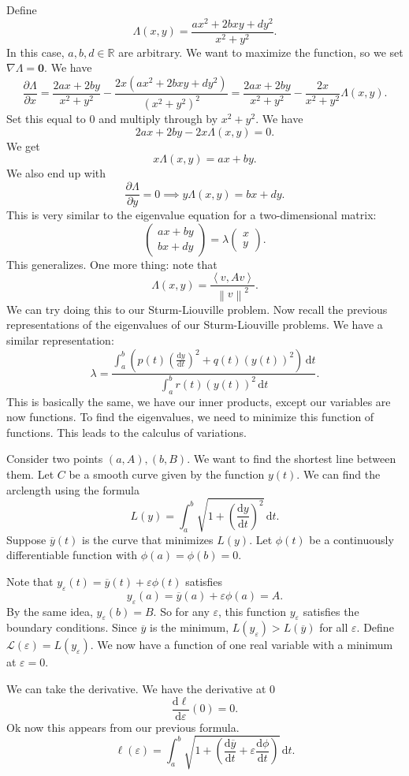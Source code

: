 Define
\[
	\Lambda (x,y)=\frac{ax^2+2bxy+dy^2}{x^2+y^2}
.\]
In this case, $a,b,d\in\mathbb{R}$ are arbitrary. We want to maximize the function, so we set $\nabla \Lambda =\mathbf{0}$. We have
\[
	\frac{\partial \Lambda }{\partial x} =\frac{2ax+2by}{x^2+y^2}-\frac{2x\left( ax^2+2bxy+dy^2 \right) }{\left( x^2+y^2 \right) ^2}=\frac{2ax+2by}{x^2+y^2}-\frac{2x}{x^2+y^2}\Lambda (x,y)
.\]
Set this equal to $0$ and multiply through by $x^2+y^2$. We have
\[
	2ax+2by-2x\Lambda (x,y)=0
.\]
We get
\[
	x\Lambda(x,y)=ax+by
.\]
We also end up with
\[
	\frac{\partial \Lambda }{\partial y} =0 \implies y\Lambda(x,y)=bx+dy
.\]
This is very similar to the eigenvalue equation for a two-dimensional matrix:
\[
	\begin{pmatrix}
		ax+by\\
		bx+dy
	\end{pmatrix} =\lambda \begin{pmatrix}
		x\\
		y
	\end{pmatrix} 
.\]
This generalizes. One more thing: note that
\[
	\Lambda(x,y)=\frac{\left\langle v,Av \right\rangle }{\left\lVert v \right\rVert^2}
.\]
We can try doing this to our Sturm-Liouville problem. Now recall the previous representations of the eigenvalues of our Sturm-Liouville problems. We have a similar representation:
\[
	\lambda =\frac{\int_{a}^{b} \left( p(t)\left( \frac{\mathrm{d}y}{\mathrm{d}t}  \right) ^2+q(t)(y(t))^2 \right)  \,\mathrm{d} t}{\int_{a}^{b} r(t)(y(t))^2 \,\mathrm{d} t}
.\]
This is basically the same, we have our inner products, except our variables are now functions. To find the eigenvalues, we need to minimize this function of functions. This leads to the calculus of variations.

Consider two points $(a,A),(b,B)$. We want to find the shortest line between them. Let $C$ be a smooth curve given by the function $y(t)$. We can find the arclength using the formula
\[
	L(y)=\int_{a}^{b} \sqrt{1+\left( \frac{\mathrm{d}y}{\mathrm{d}t}  \right) ^2}  \,\mathrm{d} t
.\]
Suppose $\overline{y} (t)$ is the curve that minimizes $L(y)$. Let $\phi (t)$ be a continuously differentiable function with $\phi (a)=\phi (b)=0$.

Note that $y_{\varepsilon }(t)=\overline{y} (t)+\varepsilon \phi (t)$ satisfies
\[
	y_{\varepsilon }(a)=\overline{y} (a)+\varepsilon \phi (a)=A
.\]
By the same idea, $y_{\varepsilon }(b)=B$. So for any $\varepsilon $, this function $y_{\varepsilon }$ satisfies the boundary conditions. Since $\overline{y} $ is the minimum, $L(y_{\varepsilon })>L(\overline{y} )$ for all $\varepsilon$. Define $\mathcal{L} (\varepsilon )=L(y_{\varepsilon })$. We now have a function of one real variable with a minimum at $\varepsilon =0$.

We can take the derivative. We have the derivative at $0$
\[
	\frac{\mathrm{d}\ell }{\mathrm{d}\varepsilon }(0)=0
.\]
Ok now this appears from our previous formula.
\[
	\ell (\varepsilon )=\int_{a}^{b} \sqrt{1+\left( \frac{\mathrm{d}\overline{y} }{\mathrm{d}t} +\varepsilon \frac{\mathrm{d}\phi }{\mathrm{d}t}  \right) }  \,\mathrm{d} t
.\]

